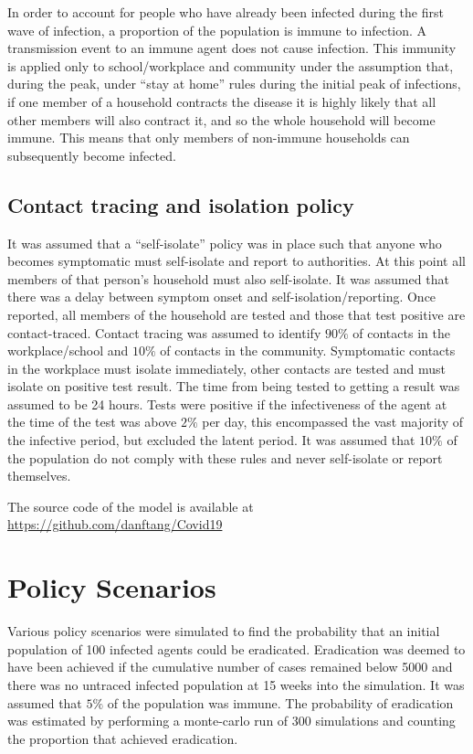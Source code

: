 \documentclass{article}
\begin{document}
In order to account for people who have already been infected during the first wave of infection, a proportion of the population is immune to infection. A transmission event to an immune agent does not cause infection. This immunity is applied only to school/workplace and community under the assumption that, during the peak, under ``stay at home'' rules during the initial peak of infections, if one member of a household contracts the disease it is highly likely that all other members will also contract it, and so the whole household will become immune. This means that only members of non-immune households can subsequently become infected.

\subsection{Contact tracing and isolation policy}

It was assumed that a ``self-isolate'' policy was in place such that anyone who becomes symptomatic must self-isolate and report to authorities. At this point all members of that person's household must also self-isolate. It was assumed that there was a delay between symptom onset and self-isolation/reporting. Once reported, all members of the household are tested and those that test positive are contact-traced. Contact tracing was assumed to identify $90\%$ of contacts in the workplace/school and $10\%$ of contacts in the community. Symptomatic contacts in the workplace must isolate immediately, other contacts are tested and must isolate on positive test result. The time from being tested to getting a result was assumed to be 24 hours. Tests were positive if the infectiveness of the agent at the time of the test was above $2\%$ per day, this encompassed the vast majority of the infective period, but excluded the latent period. It was assumed that $10\%$ of the population do not comply with these rules and never self-isolate or report themselves.

The source code of the model is available at \href{https://github.com/danftang/Covid19}{https://github.com/danftang/Covid19}

\section{Policy Scenarios}

Various policy scenarios were simulated to find the probability that an initial population of 100 infected agents could be eradicated. Eradication was deemed to have been achieved if the cumulative number of cases remained below 5000 and there was no untraced infected population at 15 weeks into the simulation. It was assumed that $5\%$ of the population was immune. The probability of eradication was estimated by performing a monte-carlo run of 300 simulations and counting the proportion that achieved eradication.
\end{document}

